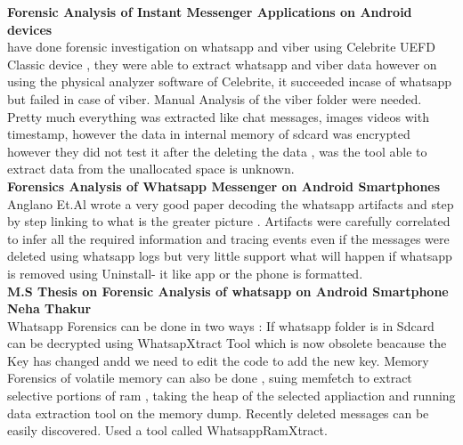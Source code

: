 \textbf{Forensic Analysis of Instant Messenger Applications on Android devices}\\
\cite{mahajan2013}have done forensic investigation on whatsapp and viber using Celebrite UEFD Classic device , they were able to extract whatsapp and viber data however on using the physical analyzer software of Celebrite, it succeeded incase of whatsapp but failed in case of viber. Manual Analysis of the viber folder were needed. Pretty much everything was extracted like chat messages, images videos with timestamp, however the data in internal memory of sdcard was encrypted however they did not test it after the deleting the data , was the tool able to extract data from the unallocated space is unknown.\\

\textbf{Forensics Analysis of Whatsapp Messenger on Android Smartphones }\\
Anglano Et.Al \cite{anglano_2014} wrote a very good paper decoding the whatsapp artifacts and step by step linking to what is the greater picture . Artifacts were carefully correlated to infer all the required information and tracing events even if the messages were deleted using whatsapp logs but very little support what will happen if whatsapp is removed using Uninstall- it like app or the phone is formatted.\\

\textbf{M.S Thesis on Forensic Analysis of whatsapp on Android Smartphone 
Neha Thakur }\\
Whatsapp \cite{Thakur2013}  Forensics can be done in two ways : If whatsapp folder is in Sdcard can be decrypted using WhatsapXtract Tool which is now obsolete beacause the Key has changed andd we need to edit the code to add the new key. Memory Forensics of volatile memory can also be done , suing memfetch to extract selective portions of ram , taking the heap of the selected appliaction and running data extraction tool on the memory dump. Recently deleted messages can be easily 
discovered. Used a tool called WhatsappRamXtract. \\
